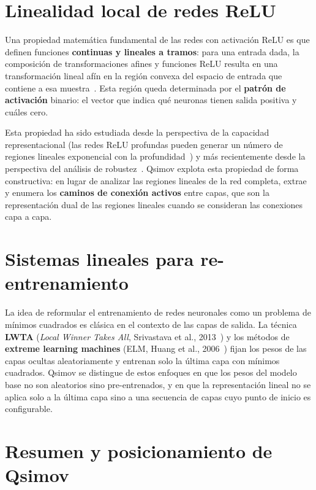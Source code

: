 \section{Linealidad local de redes ReLU}

Una propiedad matemática fundamental de las redes con activación ReLU es que definen funciones
\textbf{continuas y lineales a tramos}: para una entrada dada, la composición de transformaciones
afines y funciones ReLU resulta en una transformación lineal afín en la región convexa del espacio
de entrada que contiene a esa muestra~\cite{ref3}. Esta región queda determinada por el
\textbf{patrón de activación} binario: el vector que indica qué neuronas tienen salida positiva y
cuáles cero.

Esta propiedad ha sido estudiada desde la perspectiva de la capacidad representacional (las redes
ReLU profundas pueden generar un número de regiones lineales exponencial con la
profundidad~\cite{ref3}) y más recientemente desde la perspectiva del análisis de
robustez~\cite{ref13}. Qsimov explota esta propiedad de forma constructiva: en lugar de analizar
las regiones lineales de la red completa, extrae y enumera los \textbf{caminos de conexión activos}
entre capas, que son la representación dual de las regiones lineales cuando se consideran las
conexiones capa a capa.

\section{Sistemas lineales para re-entrenamiento}

La idea de reformular el entrenamiento de redes neuronales como un problema de mínimos cuadrados es
clásica en el contexto de las capas de salida. La técnica \textbf{LWTA} (\textit{Local Winner Takes
All}, Srivastava et al., 2013~\cite{ref14}) y los métodos de \textbf{extreme learning machines}
(ELM, Huang et al., 2006~\cite{ref15}) fijan los pesos de las capas ocultas aleatoriamente y
entrenan solo la última capa con mínimos cuadrados. Qsimov se distingue de estos enfoques en que
los pesos del modelo base no son aleatorios sino pre-entrenados, y en que la representación lineal
no se aplica solo a la última capa sino a una secuencia de capas cuyo punto de inicio es
configurable.

\section{Resumen y posicionamiento de Qsimov}

